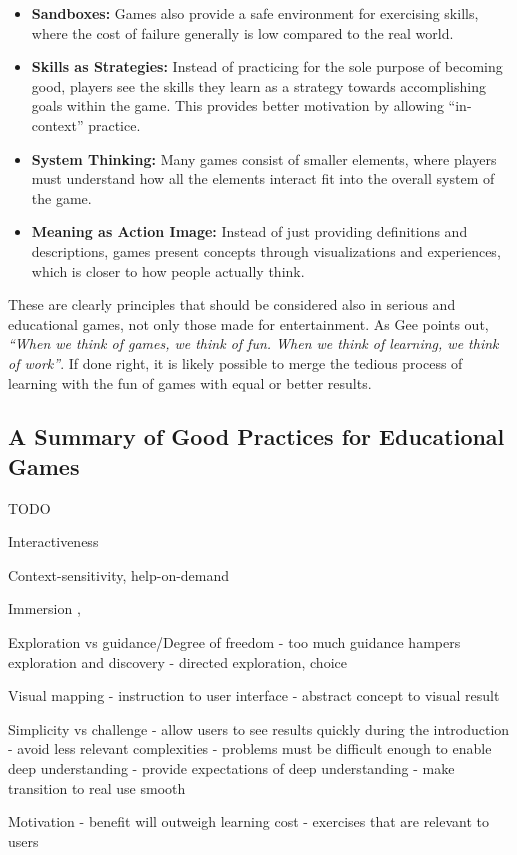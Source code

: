 \begin{itemize}
	\item{\textbf{Sandboxes:}} Games also provide a safe environment for exercising skills, where the cost of failure generally is low compared to the real world.
	\item{\textbf{Skills as Strategies:}} Instead of practicing for the sole purpose of becoming good, players see the skills they learn as a strategy towards accomplishing goals within the game. This provides better motivation by allowing ``in-context'' practice.
	\item{\textbf{System Thinking:}} Many games consist of smaller elements, where players must understand how all the elements interact fit into the overall system of the game.
	\item{\textbf{Meaning as Action Image:}} Instead of just providing definitions and descriptions, games present concepts through visualizations and experiences, which is closer to how people actually think.
\end{itemize}

\noindent
These are clearly principles that should be considered also in serious and educational games, not only those made for entertainment. As Gee points out, \emph{``When we think of games, we think of fun. When we think of learning, we think of work''}. If done right, it is likely possible to merge the tedious process of learning with the fun of games with equal or better results.

\subsection{A Summary of Good Practices for Educational Games}
\label{sec:good_practices_games}
TODO

Interactiveness

Context-sensitivity, help-on-demand \cite{andersen:tutorials_impact}

Immersion \cite{esper:codespells}, \cite{freitas:serious_games_new_paradigm}

Exploration vs guidance/Degree of freedom
	- too much guidance hampers exploration and discovery \cite{bonawitz:double_edged_pedagogy}
	- directed exploration, choice \cite{esper:design_quests_java_concepts}

Visual mapping
	- instruction to user interface \cite{huang:graphstract}
	- abstract concept to visual result \cite{esper:codespells}

Simplicity vs challenge \cite{esper:design_quests_java_concepts}
	- allow users to see results quickly during the introduction
	- avoid less relevant complexities \cite{tomek:josef_the_robot}
	- problems must be difficult enough to enable deep understanding
	- provide expectations of deep understanding \cite{esper:design_quests_java_concepts}
	- make transition to real use smooth \cite{untch:karel_conventional_language}


Motivation
	- benefit will outweigh learning cost \cite{grossman:software_learnability}
	- exercises that are relevant to users \cite{kelleher:stencils}

